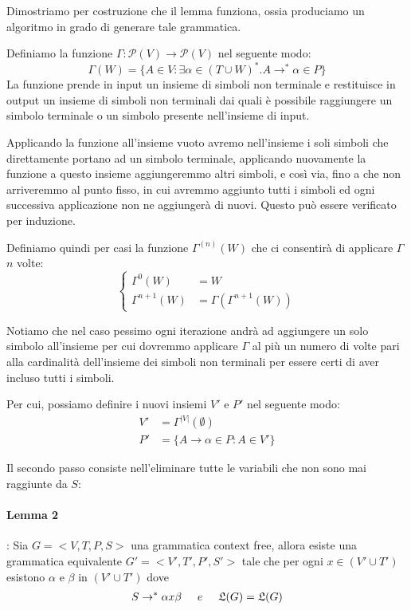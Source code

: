 \documentclass[a4paper, 10pt]{report}
\begin{document}
\begin{tcolorbox}[title=\textbf{Dimostrazione}]
Dimostriamo per costruzione che il lemma funziona, ossia produciamo un algoritmo in grado di generare tale grammatica. 
	
	Definiamo la funzione $\Gamma:\mathcal P(V)\to\mathcal P(V)$ nel seguente modo: 
	\[
		\Gamma(W) = \{A\in V:\exists\alpha\in(T\cup W)^*.A\rightarrow^*\alpha\in P\}
	\]
	La funzione prende in input un insieme di simboli non terminale e restituisce in output un insieme di simboli non terminali dai quali è possibile raggiungere un simbolo terminale o un simbolo presente nell'insieme di input. 
	
	Applicando la funzione all'insieme vuoto avremo nell'insieme i soli simboli che direttamente portano ad un simbolo terminale, applicando nuovamente la funzione a questo insieme aggiungeremmo altri simboli, e così via, fino a che non arriveremmo al punto fisso, in cui avremmo aggiunto tutti i simboli ed ogni successiva applicazione non ne aggiungerà di nuovi. Questo può essere verificato per induzione. 
	
	Definiamo quindi per casi la funzione $\Gamma^{(n)}(W)$ che ci consentirà di applicare $\Gamma$ $n$ volte:
	\[
		\begin{cases}
			\Gamma^0(W)&= W \\
			\Gamma^{n+1}(W)&=\Gamma(\Gamma^{n+1}(W))
		\end{cases}
	\]
	
	Notiamo che nel caso pessimo ogni iterazione andrà ad aggiungere un solo simbolo all'insieme per cui dovremmo applicare $\Gamma$ al più un numero di volte pari alla cardinalità dell'insieme dei simboli non terminali per essere certi di aver incluso tutti i simboli.
	
	Per cui, possiamo definire i nuovi insiemi $V'$ e $P'$ nel seguente modo:
	\[
		\begin{aligned}
			V'&=\Gamma^{|V|}(\emptyset)\\
			P'&=\{A\to\alpha\in P: A\in V' \}
		\end{aligned}
	\]
\end{tcolorbox}

\noindent Il secondo passo consiste nell'eliminare tutte le variabili che non sono mai raggiunte da $S$:


\paragraph*{Lemma 2}: Sia $G = <V, T, P, S>$ una grammatica context free, allora esiste una grammatica equivalente $G' = <V', T', P', S'>$ tale che per ogni $x \in (V' \cup T')$ esistono $\alpha$ e $\beta$ in $(V' \cup T')$ dove
\begin{align*}
S \rightarrow^* \alpha x \beta \hspace{0.5cm} e \hspace{0.5cm} \mathfrak{L}(G) = \mathfrak{L}(G)
\end{align*}
\end{document}
